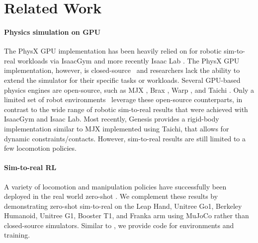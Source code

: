 \section{Related Work}


\paragraph{Physics simulation on GPU} The PhysX GPU implementation \cite{liang2018gpu} has been heavily relied on for robotic sim-to-real workloads via IsaacGym \cite{makoviychuk2021isaac} and more recently Isaac Lab \cite{mittal2023orbit}. The PhysX GPU implementation, however, is closed-source~\cite{liang2018gpu} and researchers lack the ability to extend the simulator for their specific tasks or workloads. Several GPU-based physics engines are open-source, such as MJX \cite{todorov2012mujoco, mujocoxla}, Brax \cite{freeman2021brax}, Warp \cite{macklin2022warp}, and Taichi \cite{hu2019difftaichi}. Only a limited set of robot environments~\cite{sferrazza2024humanoidbench, xue2024full} leverage these open-source counterparts, in contrast to the wide range of robotic sim-to-real results that were achieved with IsaacGym and Isaac Lab. Most recently, Genesis \cite{Genesis} provides a rigid-body implementation similar to MJX implemented using Taichi, that allows for dynamic constraints/contacts. However, sim-to-real results are still limited to a few locomotion policies.

\paragraph{Sim-to-real RL} A variety of locomotion and manipulation policies have successfully been deployed in the real world zero-shot \cite{cheng2024extreme, zhuang2023robot, li2024reinforcement, long2024learning, radosavovic2024learning, singh2024dextrah, cho2024corn}. We complement these results by demonstrating zero-shot sim-to-real on the Leap Hand, Unitree Go1, Berkeley Humanoid, Unitree G1, Booster T1, and Franka arm using MuJoCo rather than closed-source simulators. Similar to \cite{mittal2023orbit, makoviychuk2021isaac}, we provide code for environments and training.

